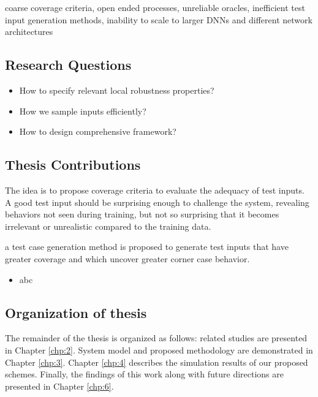 coarse coverage criteria, open ended processes, unreliable
oracles, inefficient test input generation methods, inability to
scale to larger DNNs and different network architectures


		
		
\subsection{Research Questions}\hypertarget{researchquestions}{}
\begin{itemize}
	\item How to specify relevant local robustness properties?
	\item How we sample inputs efficiently?
	\item How to design comprehensive framework?
   \end{itemize}


\subsection{Thesis Contributions}\hypertarget{contributions}{}
The idea is to propose coverage criteria to evaluate the adequacy of test inputs. A good test input should be surprising enough to challenge the system, revealing behaviors not seen during training, but not so surprising that it becomes irrelevant or unrealistic compared to the training data.

a test case generation method is proposed to generate test inputs that have greater coverage and which uncover greater corner case behavior.
\begin{itemize}	
	\item abc
\end{itemize}


\subsection{Organization of thesis}\hypertarget{organization of thesis}{}
The remainder of the thesis is organized as follows: related studies are presented in Chapter \ref{chp:2}. System model and proposed methodology are demonstrated in Chapter \ref{chp:3}. Chapter \ref{chp:4} describes the simulation results of our proposed schemes. Finally, the findings of this work along with future directions are presented in Chapter \ref{chp:6}.

\clearpage
